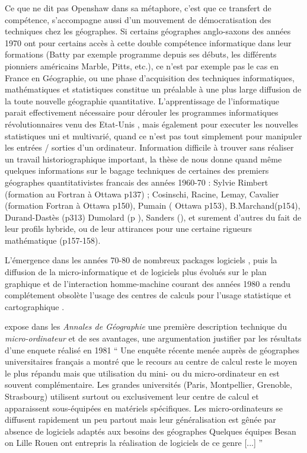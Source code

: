 Ce que ne dit pas Openshaw dans sa métaphore, c’est que ce transfert de compétence, s’accompagne aussi d’un mouvement de démocratisation des techniques chez les géographes. Si certains géographes anglo-saxons des années 1970 ont pour certains accès à cette double compétence informatique dans leur formations (Batty par exemple programme depuis ses débuts, les différents pionniers américains Marble, Pitts, etc.), ce n’est par exemple pas le cas en France en Géographie, ou une phase d’acquisition des techniques informatiques, mathématiques et statistiques constitue un préalable à une plus large diffusion de la toute nouvelle géographie quantitative. L’apprentissage de l’informatique parait effectivement nécessaire pour dérouler les programmes informatiques révolutionnaires venu des Etat-Unis \autocite[150,127]{Cuyala2014}, mais également pour executer les nouvelles statistiques uni et multivarié, quand ce n’est pas tout simplement pour manipuler les entrées / sorties d’un ordinateur. Information difficile à trouver sans réaliser un travail historiographique important, la thèse de \textcite{Cuyala2014} nous donne quand même quelques informations sur le bagage techniques de certaines des premiers géographes quantitativistes francais des années 1960-70 : Sylvie Rimbert (formation au Fortran à Ottawa p137) ;  Cosinschi, Racine, Lemay, Cavalier (formation Fortran à Ottawa p150), Pumain ( Ottawa p153), B.Marchand(p154), Durand-Dastès (p313) Dumolard (p ), Sanders (), et surement d’autres du fait de leur profils hybride, ou de leur attirances pour une certaine rigueurs mathématique (p157-158).

L’émergence dans les années 70-80 de nombreux packages logiciels \autocite[444]{Joliveau2004}, puis la diffusion de la micro-informatique et de logiciels plus évolués sur le plan graphique et de l’interaction homme-machine courant des années 1980 a rendu complétement obsolète l’usage des centres de calculs pour l’usage statistique et cartographique \autocites{Joliveau2004, Waniez2010}.

\textcite{Lecarpentier1983} expose dans les \textit{Annales de Géographie} une première description technique du \textit{micro-ordinateur} et de ses avantages, une argumentation justifier par les résultats d'une enquete réalisé en 1981 \enquote{ Une enquête récente menée auprès de géographes universitaires français a montré que le recours au centre de calcul reste le
moyen le plus répandu mais que utilisation du mini- ou du micro-ordinateur en est souvent complémentaire. Les grandes universités (Paris, Montpellier,  Grenoble, Strasbourg) utilisent surtout ou exclusivement leur centre de calcul et apparaissent sous-équipées en matériels spécifiques. Les micro-ordinateurs se diffusent rapidement un peu partout mais leur généralisation est gênée par absence de logiciels adaptés aux besoins des géographes Quelques équipes Besan on Lille Rouen ont entrepris la réalisation de logiciels de ce genre [...] }

